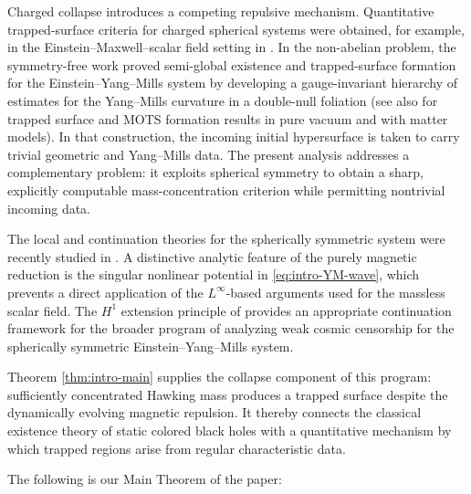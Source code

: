 \documentclass{article}[11pt]
\numberwithin{equation}{section}
\begin{document}
Charged collapse introduces a competing repulsive mechanism. Quantitative
trapped-surface criteria for charged spherical systems were obtained, for
example, in the Einstein--Maxwell--scalar field setting in \cite{An}.
In the non-abelian problem, the symmetry-free work \cite{A-M-Y} proved semi-global
existence and trapped-surface formation for the Einstein--Yang--Mills
system by developing a gauge-invariant hierarchy of estimates for the
Yang--Mills curvature in a double-null foliation (see also \cite{A19,A17,AnThesis,AnAth,AthL, A-M-Y1, chen, LKR, M-Y1,  Kl-Rod} for trapped surface and MOTS formation results in pure vacuum and with matter models). In that construction,
the incoming initial hypersurface is taken to carry trivial geometric and
Yang--Mills data. The present analysis addresses a complementary problem:
it exploits spherical symmetry to obtain a sharp, explicitly computable
mass-concentration criterion while permitting nontrivial incoming data.

The local and continuation theories for the spherically symmetric system were
recently studied in \cite{Li_Wang}. A distinctive analytic feature of the
purely magnetic reduction is the singular nonlinear potential in
\eqref{eq:intro-YM-wave}, which prevents a direct application of the
\(L^\infty\)-based arguments used for the massless scalar field. The
\(H^1\) extension principle of \cite{Li_Wang} provides an appropriate
continuation framework for the broader program of analyzing weak cosmic
censorship for the spherically symmetric Einstein--Yang--Mills system.

Theorem \ref{thm:intro-main} supplies the collapse component of this
program: sufficiently concentrated Hawking mass produces a trapped
surface despite the dynamically evolving magnetic repulsion. It thereby
connects the classical existence theory of static colored black holes with
a quantitative mechanism by which trapped regions arise from regular
characteristic data.

\vspace{3mm}

\noindent The following is our Main Theorem of the paper:
\end{document}
